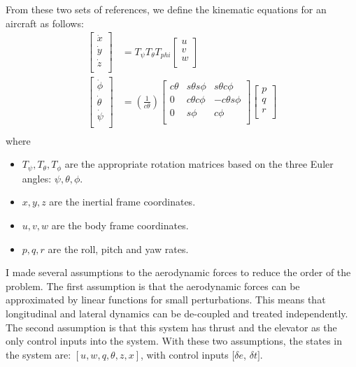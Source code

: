 From these two sets of references, we define the kinematic equations
for an aircraft as follows:
\begin{align*}
  \begin{bmatrix}
    \dot x \\
    \dot y \\
    \dot z \\
  \end{bmatrix}
  &=
  T_{\psi}T_{\theta}T_{phi}
  \begin{bmatrix}
    u \\
    v \\
    w \\
  \end{bmatrix} \\
  \begin{bmatrix}
    \dot \phi \\
    \dot \theta \\
    \dot \psi \\
  \end{bmatrix}
  &=
  (\frac{1}{c \theta})
  \begin{bmatrix}
    c \theta & s\theta s \phi & s \theta c \phi \\
    0 & c \theta c \phi & -c \theta s \phi \\
    0 & s \phi & c \phi\\
  \end{bmatrix} 
  \begin{bmatrix}
    p \\
    q \\
    r \\
  \end{bmatrix} \\
\end{align*}
where
\begin{itemize}
\item $T_{\psi}, T_{\theta}, T_{\phi}$ are the appropriate rotation
matrices based on the three Euler angles: $\psi, \theta,
\phi$.
\item $x,y,z$ are the inertial frame coordinates.
\item $u,v,w$ are the body frame coordinates.
\item $p,q,r$ are the roll, pitch and yaw rates.
\end{itemize}

I made several assumptions to the aerodynamic forces to reduce the
order of the problem. The first assumption is that
the aerodynamic forces can be approximated by linear functions for
small perturbations. This means that longitudinal and lateral dynamics
can be de-coupled and treated independently. The second assumption is that this
system has thrust and the elevator as the only control inputs
into the system. With these two assumptions, the states in the system are: $[u, w, q, \theta, z,
  x]$, with control inputs $[\delta e$, $\delta t]$.

